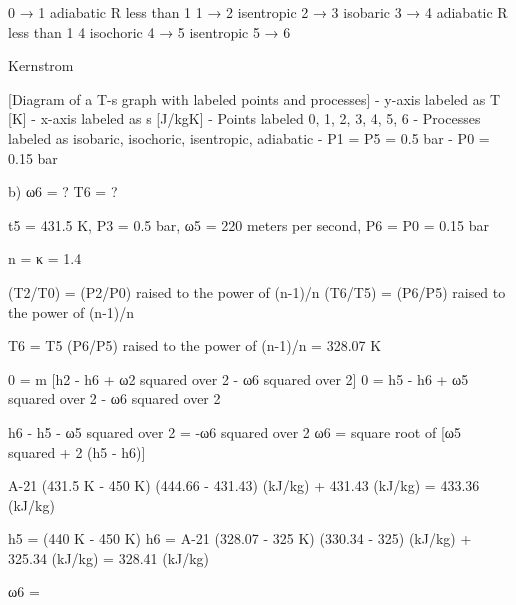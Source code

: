 0 → 1 adiabatic R less than 1  
1 → 2 isentropic  
2 → 3 isobaric  
3 → 4 adiabatic R less than 1  
4 isochoric  
4 → 5 isentropic  
5 → 6  

Kernstrom

[Diagram of a T-s graph with labeled points and processes]
- y-axis labeled as T [K]
- x-axis labeled as s [J/kgK]
- Points labeled 0, 1, 2, 3, 4, 5, 6
- Processes labeled as isobaric, isochoric, isentropic, adiabatic
- P1 = P5 = 0.5 bar
- P0 = 0.15 bar

b) ω6 = ?  T6 = ?

t5 = 431.5 K, P3 = 0.5 bar, ω5 = 220 meters per second, P6 = P0 = 0.15 bar

n = κ = 1.4

(T2/T0) = (P2/P0) raised to the power of (n-1)/n  
(T6/T5) = (P6/P5) raised to the power of (n-1)/n  

T6 = T5 (P6/P5) raised to the power of (n-1)/n = 328.07 K

0 = m [h2 - h6 + ω2 squared over 2 - ω6 squared over 2]  
0 = h5 - h6 + ω5 squared over 2 - ω6 squared over 2  

h6 - h5 - ω5 squared over 2 = -ω6 squared over 2  
ω6 = square root of [ω5 squared + 2 (h5 - h6)]

A-21 (431.5 K - 450 K) (444.66 - 431.43) (kJ/kg) + 431.43 (kJ/kg) = 433.36 (kJ/kg)

h5 = (440 K - 450 K)  
h6 = A-21 (328.07 - 325 K) (330.34 - 325) (kJ/kg) + 325.34 (kJ/kg) = 328.41 (kJ/kg)

ω6 =